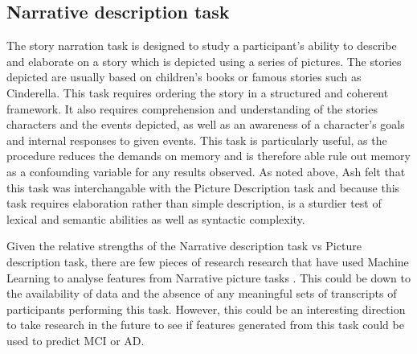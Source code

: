 \documentclass[a4paper]{article}
\begin{document}
\subsection{Narrative description task}
The story narration task is designed to study a participant's ability to describe and elaborate on a story which is depicted using a series of pictures. The stories depicted are usually based on children's books or famous stories such as Cinderella. \cite{Fraser2014} This task requires ordering the story in a structured and coherent framework. It also requires comprehension and understanding of the stories characters and the events depicted, as well as an awareness of a character's goals and internal responses to given events. This task is particularly useful, as the procedure reduces the demands on memory and is therefore able rule out memory as a confounding variable for any results observed. As noted above, Ash \cite{Ash2012} felt that this task was interchangable with the Picture Description task and because this task requires elaboration rather than simple description, is a sturdier test of lexical and semantic abilities as well as syntactic complexity. \cite{DeLira2011} \newline
\par
Given the relative strengths of the Narrative description task vs Picture description task, there are few pieces of research research that have used Machine Learning to analyse features from Narrative picture tasks \cite{Fraser2014}. This could be down to the availability of data and the absence of any meaningful sets of transcripts of participants performing this task. However, this could be an interesting direction to take research in the future to see if features generated from this task could be used to predict MCI or AD.  \newline
\par
\end{document}
